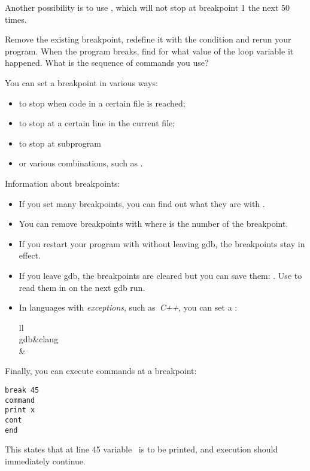 Another possibility is to use , which will not stop at
breakpoint 1 the next 50 times.

Remove the existing breakpoint, redefine it with the condition 
and rerun your program. When the program breaks, find for what value
of the loop variable it happened. What is the sequence of commands you use?

You can set a breakpoint in various ways:
\begin{itemize}
\item {} to stop when code in a certain file is reached;
\item {} to stop at a certain line in the current file;
\item {} to stop at subprogram 
\item or various combinations, such as .
\end{itemize}

Information about breakpoints:

\begin{itemize}
\item If you set many breakpoints, you can find out what they are with
  . 
\item You can remove breakpoints with  where  is the
  number of the breakpoint.
\item If you restart your program with  without leaving gdb,
  the breakpoints stay in effect.
\item If you leave gdb, the breakpoints are cleared but you can save
  them: . Use  to read
  them in on the next gdb run.
\item In languages with \emph{exceptions}, such
  as~\emph{C++}, you can set a :

  \begin{fntable}{ll}
    \\
    \midrule
    gdb&clang\\   &\\
  \end{fntable}

\end{itemize}

Finally, you can execute commands at a breakpoint:
\begin{verbatim}
break 45
command
print x
cont
end
\end{verbatim}
This states that at line 45 variable~ is to be printed, and execution
should immediately continue.

